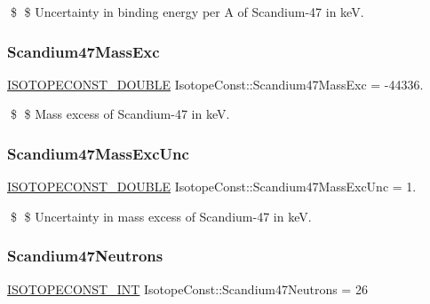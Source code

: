 \$ \$ Uncertainty in binding energy per A of Scandium-\/47 in keV. \mbox{\label{group___isotope_const-_scandium-_sc47_ga35459b63684892d5ace3282a31ef859e}} 
\subsubsection{\texorpdfstring{Scandium47\+Mass\+Exc}{Scandium47MassExc}}
{\footnotesize\ttfamily \mbox{\hyperlink{group___isotope_const-_macros_ga8f45a7272ce02c0b4c65c44636ed719a}{I\+S\+O\+T\+O\+P\+E\+C\+O\+N\+S\+T\+\_\+\+D\+O\+U\+B\+LE}} Isotope\+Const\+::\+Scandium47\+Mass\+Exc = -\/44336.}

\$ \$ Mass excess of Scandium-\/47 in keV. \mbox{\label{group___isotope_const-_scandium-_sc47_ga61178bf61ffbdbfd623c88a3d3ca0f84}} 
\subsubsection{\texorpdfstring{Scandium47\+Mass\+Exc\+Unc}{Scandium47MassExcUnc}}
{\footnotesize\ttfamily \mbox{\hyperlink{group___isotope_const-_macros_ga8f45a7272ce02c0b4c65c44636ed719a}{I\+S\+O\+T\+O\+P\+E\+C\+O\+N\+S\+T\+\_\+\+D\+O\+U\+B\+LE}} Isotope\+Const\+::\+Scandium47\+Mass\+Exc\+Unc = 1.}

\$ \$ Uncertainty in mass excess of Scandium-\/47 in keV. \mbox{\label{group___isotope_const-_scandium-_sc47_gabe38922c10d57d21c211a29b8297eb24}} 
\subsubsection{\texorpdfstring{Scandium47\+Neutrons}{Scandium47Neutrons}}
{\footnotesize\ttfamily \mbox{\hyperlink{group___isotope_const-_macros_ga5f18360b3e99483a35c32d789e62621c}{I\+S\+O\+T\+O\+P\+E\+C\+O\+N\+S\+T\+\_\+\+I\+NT}} Isotope\+Const\+::\+Scandium47\+Neutrons = 26}

